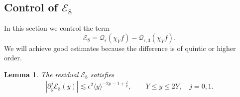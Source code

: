 \documentclass[11pt]{amsart}
\newtheorem{lemma}[theorem]{Lemma}
\theoremstyle{definition}
\theoremstyle{remark}
\numberwithin{equation}{section}
\newcommand{\mc}[1]{\mathcal{#1}}
\newcommand{\ang}[1]{\langle #1 \rangle}
\begin{document}
\subsection{Control of \texorpdfstring{$\mc{E}_8$}{E8}}

In this section we control the term
\[\mc{E}_8 = \mc{Q}_\epsilon(\chi_Y f) - \mc{Q}_{\epsilon, 3}(\chi_Y f).\]
We will achieve good estimates because the difference is of quintic or higher order. 

\begin{lemma}\label{lem:approx_E8}
    The residual $\mc{E}_8$ satisfies
    \begin{equation}\label{eqn:approx_E8_bound}
        |\partial_y^j\mc{E}_8(y)|
        \lesssim\epsilon^2\ang{y}^{-2p-1+\frac{j}{p}},
        \qquad Y\leq y\leq2Y,\quad j=0,1.
    \end{equation}
\end{lemma}
\end{document}
